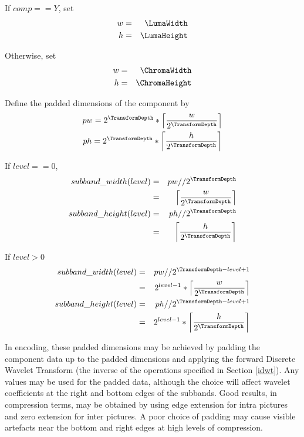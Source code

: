 If $comp==Y$, set
\begin{eqnarray*}
w & = & \LumaWidth \\
h & = & \LumaHeight
\end{eqnarray*}

Otherwise, set
\begin{eqnarray*}
w & = & \ChromaWidth \\
h & = & \ChromaHeight
\end{eqnarray*}

Define the padded dimensions of the component by
\begin{eqnarray*}
pw = 2^{\TransformDepth}*\left\lceil\frac{w}{2^{\TransformDepth}}\right\rceil\\ 
ph = 2^{\TransformDepth}*\left\lceil\frac{h}{2^{\TransformDepth}}\right\rceil
\end{eqnarray*}

If $level==0$,
\begin{eqnarray*}
subband\_width(level) & = & pw//2^{\TransformDepth} \\
& = & \left\lceil\frac{w}{2^{\TransformDepth}}\right\rceil \\
subband\_height(level) & = & ph//2^{\TransformDepth} \\
& = & \left\lceil\frac{h}{2^{\TransformDepth}}\right\rceil
\end{eqnarray*}

If $level>0$
\begin{eqnarray*}
subband\_width(level) & = & pw//2^{\TransformDepth-level+1} \\
& = & 2^{level-1}*\left\lceil \frac{w}{2^{\TransformDepth}}\right\rceil \\
subband\_height(level) & = & ph//2^{\TransformDepth-level+1} \\
& = & 2^{level-1}*\left\lceil\frac{h}{2^{\TransformDepth}}\right\rceil
\end{eqnarray*}

\begin{informative}
In encoding, these padded dimensions may be achieved by padding the 
component data up to the padded dimensions and applying the forward
Discrete Wavelet Transform (the inverse of the operations specified in
Section \ref{idwt}). Any values may be used for the padded data, although
the choice will affect wavelet coefficients at the right and bottom 
edges of the subbands. Good results, in compression terms, may be obtained
 by using edge extension for intra pictures and zero extension for inter 
pictures. A poor choice of padding may cause visible artefacts near the
bottom and right edges at high levels of compression.
\end{informative}

